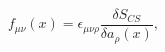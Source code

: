 \begin{equation}
  f_{\mu \nu} (x) = \epsilon_{\mu \nu \rho}
                    \frac{\delta S_{CS}}{\delta a_\rho (x)},
\end{equation}

